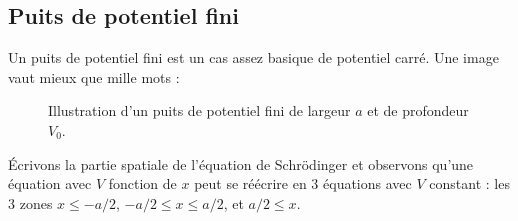 \subsection{Puits de potentiel fini}
Un puits de potentiel fini est un cas assez basique de potentiel carré. Une image vaut mieux que mille mots :

\begin{figure}[h]
  \centering
  \scalebox{1.2}{}
  \caption{Illustration d'un puits de potentiel fini de largeur $a$ et de profondeur $V_0$.}
  \label{fig:chap2-potentiel_fini}
\end{figure}

Écrivons la partie spatiale de l'équation de Schrödinger et observons qu'une équation avec $V$ fonction de $x$ peut se réécrire en 3 équations avec $V$ constant : les 3 zones $x\leq -a/2$, $-a/2\leq x\leq a/2$, et $a/2 \leq x$.

